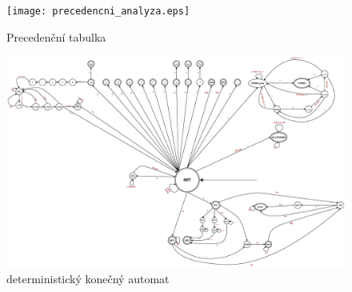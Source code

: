 \documentclass[12pt, a4paper]{article}
\begin{document}
\begin{figure}
	{\caption{Precedenční tabulka} \label{fig:precedence}} 
	\texttt{[image: precedencni\_analyza.eps]}
\end{figure}

\begin{landscape}
\begin{figure}[ht]
	\caption{deterministický konečný automat}\label{automat}
	\includegraphics[scale=0.5, center]{konecny_automat.eps}
\end{figure}
\end{landscape}
\end{document}
